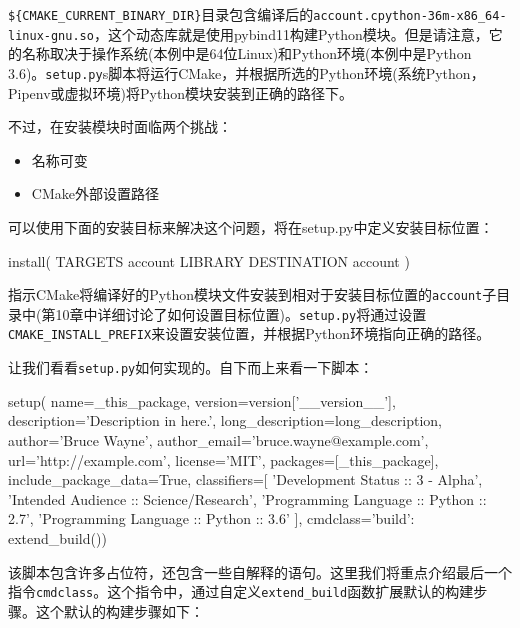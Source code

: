 
\texttt{\$\{CMAKE\_CURRENT\_BINARY\_DIR\}}目录包含编译后的\texttt{account.cpython-36m-x86\_64-linux-gnu.so}，这个动态库就是使用pybind11构建Python模块。但是请注意，它的名称取决于操作系统(本例中是64位Linux)和Python环境(本例中是Python 3.6)。\texttt{setup.py}s脚本将运行CMake，并根据所选的Python环境(系统Python，Pipenv或虚拟环境)将Python模块安装到正确的路径下。

不过，在安装模块时面临两个挑战：

\begin{itemize}
\item 名称可变

\item CMake外部设置路径

\end{itemize}

可以使用下面的安装目标来解决这个问题，将在setup.py中定义安装目标位置：

\begin{codebox}[cmake]
install(
  TARGETS
    account
  LIBRARY
    DESTINATION account
  )
\end{codebox}

指示CMake将编译好的Python模块文件安装到相对于安装目标位置的\texttt{account}子目录中(第10章中详细讨论了如何设置目标位置)。\texttt{setup.py}将通过设置\texttt{CMAKE\_INSTALL\_PREFIX}来设置安装位置，并根据Python环境指向正确的路径。

让我们看看\texttt{setup.py}如何实现的。自下而上来看一下脚本：

\begin{codebox}[python]
setup(
  name=_this_package,
  version=version['__version__'],
  description='Description in here.',
  long_description=long_description,
  author='Bruce Wayne',
  author_email='bruce.wayne@example.com',
  url='http://example.com',
  license='MIT',
  packages=[_this_package],
  include_package_data=True,
  classifiers=[
    'Development Status :: 3 - Alpha',
    'Intended Audience :: Science/Research',
    'Programming Language :: Python :: 2.7',
    'Programming Language :: Python :: 3.6'
  ],
  cmdclass={'build': extend_build()})
\end{codebox}

该脚本包含许多占位符，还包含一些自解释的语句。这里我们将重点介绍最后一个指令\texttt{cmdclass}。这个指令中，通过自定义\texttt{extend\_build}函数扩展默认的构建步骤。这个默认的构建步骤如下：

